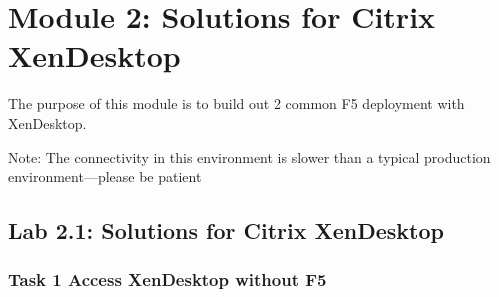 \documentclass[letterpaper,10pt,english]{sphinxmanual}
\begin{document}
\section{Module 2: Solutions for Citrix XenDesktop}
\label{\detokenize{class2/module2/module2::doc}}\label{\detokenize{class2/module2/module2:module-2-solutions-for-citrix-xendesktop}}
The purpose of this module is to build out 2 common F5 deployment with
XenDesktop.

Note: The connectivity in this environment is slower than a typical
production environment—please be patient


\subsection{Lab 2.1: Solutions for Citrix XenDesktop}
\label{\detokenize{class2/module2/lab1:lab-2-1-solutions-for-citrix-xendesktop}}\label{\detokenize{class2/module2/lab1::doc}}

\subsubsection{Task 1 \textendash{} Access XenDesktop without F5}
\label{\detokenize{class2/module2/lab1:task-1-access-xendesktop-without-f5}}
\end{document}
